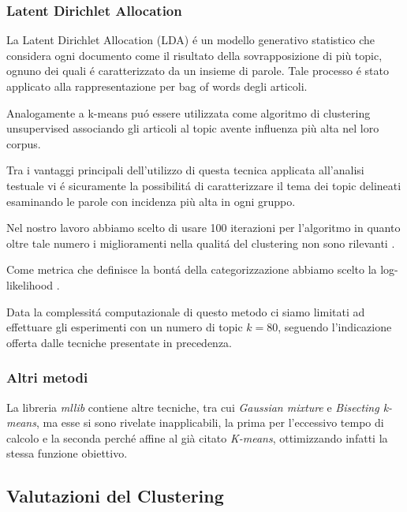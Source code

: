 \documentclass[
	11pt, %
	a4paper, %
	oneside, %
	headinclude,footinclude, %
	BCOR5mm, %
]{scrartcl}
\begin{document}
		\subsubsection{Latent Dirichlet Allocation}

			La Latent Dirichlet Allocation (LDA)\cite{lda} \'{e} un modello generativo statistico che considera ogni documento 
			come il risultato della sovrapposizione di più topic, ognuno dei quali \'{e} caratterizzato da un insieme di parole.
			Tale processo \'{e} stato applicato alla rappresentazione per bag of words degli articoli.
			
			Analogamente a k-means pu\'{o} essere utilizzata come algoritmo di clustering unsupervised associando gli articoli al topic 
			avente influenza più alta nel loro corpus.
			
			Tra i vantaggi principali dell'utilizzo di questa tecnica applicata all'analisi testuale vi \'{e} sicuramente la 
			possibilit\'{a} di caratterizzare il tema dei topic delineati esaminando le parole con incidenza più alta in ogni gruppo.
			
			
			Nel nostro lavoro abbiamo scelto di usare 100 iterazioni per l'algoritmo in quanto oltre tale numero i miglioramenti 
			nella qualit\'{a} del clustering non sono rilevanti \cite{ldaiterations}.
			
			Come metrica che definisce la bont\'{a} della categorizzazione abbiamo scelto la log-likelihood \cite{ldaevaluation}.
			
			Data la complessit\'{a} computazionale di questo metodo ci siamo limitati ad effettuare gli esperimenti con un numero di 
			topic $k=80$, seguendo l'indicazione offerta dalle tecniche presentate in precedenza.
		
		\subsubsection{Altri metodi}
			La libreria \emph{mllib} contiene altre tecniche, tra cui \emph{Gaussian mixture} e \emph{Bisecting k-means}, ma esse si sono rivelate inapplicabili, la prima per l'eccessivo tempo di calcolo e la seconda perché affine al già citato \emph{K-means}, ottimizzando infatti la stessa funzione obiettivo.


	\subsection{Valutazioni del Clustering}
\end{document}
